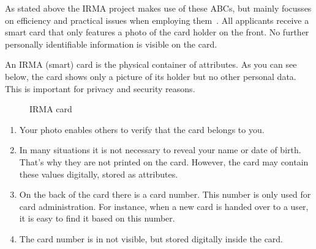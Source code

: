 As stated above the IRMA project makes use of these ABCs, but mainly focusses on efficiency and practical issues when employing them~\cite{abcofabc}. All applicants receive a smart card that only features a photo of the card holder on the front. No further personally identifiable information is visible on the card.

An IRMA (smart) card is the physical container of attributes. As you can see below, the card shows only a picture of its holder but no other personal data. This is important for privacy and security reasons.

\begin{figure}[!ht]
  \centering
  \caption{IRMA card}
  \label{fig:dummy}
\end{figure}

\begin{enumerate}
	\item Your photo enables others to verify that the card belongs to you.
  \item In many situations it is not necessary to reveal your name or date of birth. That’s why they are not printed on the card. However, the card may contain these values digitally, stored as attributes.
  \item On the back of the card there is a card number. This number is only used for card administration. For instance, when a new card is handed over to a user, it is easy to find it based on this number.
  \item The card number is in not visible, but stored digitally inside the card.
\end{enumerate}

